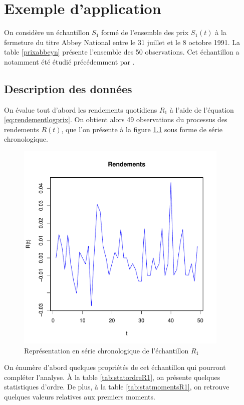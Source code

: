 \chapter{Exemple d'application}
\label{chap:application}%

On considère un échantillon $S_1$ formé de l'ensemble des prix
$S_1(t)$ à la fermeture du titre Abbey National entre le 31 juillet et
le 8 octobre 1991. La table \ref{prixabbeyn} présente l'ensemble des 50
observations. Cet échantillon a notamment été étudié précédemment par
\cite{buckle1995bayesian}.

\section{Description des données}
\label{sec:analysepA}

On évalue tout d'abord les rendements quotidiens $R_1$ à l'aide de
l'équation \eqref{eq:rendementlogprix}. On obtient alors 49
observations du processus des rendements $R(t)$, que l'on présente à
la figure \ref{fig:seriechronoR1} sous forme de série chronologique.

\begin{figure}[!ht]
  \centering
  \includegraphics[height=4in,
  width=4in]{./graphiques/ABBEYN-chronologie.pdf}
  \caption{Représentation en série chronologique de l'échantillon
    $R_1$}
  \label{fig:seriechronoR1}
\end{figure}

On énumère d'abord quelques propriétés de cet échantillon qui pourront
compléter l'analyse. À la table \ref{tab:statordreR1}, on présente
quelques statistiques d'ordre. De plus, à la table
\ref{tab:statmomentsR1}, on retrouve quelques valeurs relatives aux
premiers moments.

